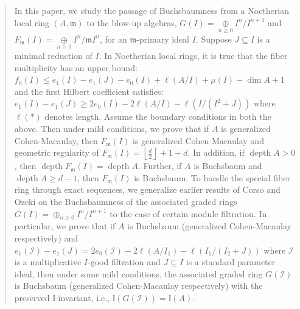 \documentclass[11pt,reqno]{amsart}
\theoremstyle{definition}
\newcommand{\m}{\mathfrak m}
\def\I{{\mathcal I}}
\DeclareMathOperator{\depth}{depth}
\numberwithin{equation}{section}
\begin{document}
	\begin{abstract}
 In this paper, we study the passage of Buchsbaumness from a Noetherian local ring $(A,\m)$ to the blow-up algebras,  $G(I)=\mathop{\oplus}\limits_{n\geq 0}I^n/I^{n+1}$ and  $F_{\m}(I)=\mathop{\oplus}\limits_{n\geq 0} I^n/\m I^n$, for an $\m$-primary ideal $I$.  Suppose $J\subseteq I$ is a minimal reduction of $I$. In Noetherian local rings, it is true that the fiber multiplicity has an upper bound: $f_0(I)\leq e_1(I)-e_1(J)-e_0(I)+\ell(A/I)+\mu(I)-\dim A+1$ and the first Hilbert coefficient satisfies: $e_1(I)-e_1(J)\geq 2e_0(I)-2\ell(A/I)-\ell(I/(I^2+J))$ where $\ell(*)$ denotes length. Assume the boundary conditions in both the above. Then under mild conditions, we prove that if $A$ is generalized Cohen-Macaulay, then $F_\m(I)$ is generalized Cohen-Macaulay and geometric regularity of $F_\m(I)=\left\lfloor \frac{d}{2}\right\rfloor +1+d$. In addition, if $\depth A>0$, then $\depth F_\m(I)=\depth A$. Further, if $A$ is Buchsbaum and $\depth A\geq d-1$, then  $F_\m(I)$ is Buchsbaum. To handle the special fiber ring through exact sequences, we generalize earlier results of Corso and Ozeki on the Buchsbaumness of the associated graded rings $G(I)=\mathop\oplus_{n\geq 0} I^n/I^{n+1}$ to the case of certain module filtration. In particular, we prove that if $A$ is Buchsbaum (generalized Cohen-Macaulay respectively) and $e_1(\I)-e_1(J)=2e_0(\I)-2\ell(A/I_1)-\ell(I_1/(I_2+J))$ where $\I$ is a multiplicative $I$-good filtration and $J\subseteq I$ is a standard parameter ideal, then under some mild conditions, the associated graded ring $G(\I)$  is Buchsbaum (generalized Cohen-Macaulay respectively) with the preserved $\mathds{I}$-invariant, i.e., $\mathds{I}(G(\I))=\mathds{I}(A)$.




\end{abstract}
\end{document}
